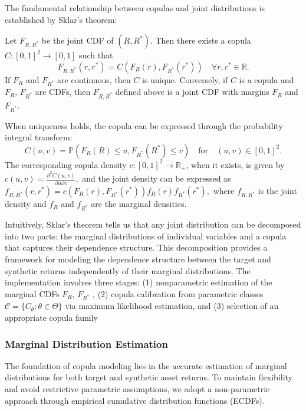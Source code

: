 The fundamental relationship between copulas and joint distributions is established by Sklar's theorem:

\begin{theorem}[Sklar (1959)]
Let $F_{R,R^*}$ be the joint CDF of $(R,R^*)$. Then there exists a copula $C: [0,1]^2 \to [0,1]$ such that
\begin{equation}
   F_{R,R^*}(r,r^*) = C(F_R(r), F_{R^*}(r^*)) \quad \forall r,r^* \in \mathbb{R}.
\end{equation}
If $F_R$ and $F_{R^*}$ are continuous, then $C$ is unique. Conversely, if $C$ is a copula and $F_R$, $F_{R^*}$ are CDFs, then $F_{R,R^*}$ defined above is a joint CDF with margins $F_R$ and $F_{R^*}$.
\end{theorem}
%
When uniqueness holds, the copula can be expressed through the probability integral transform: 
$$
C(u,v) = \mathbb P( F_R(R) \leq u, F_{R^*}(R^*) \leq v) 
\quad \text{for} \quad
(u,v)\in[0,1]^2
.
$$
The corresponding copula density $c:[0,1]^2\to\mathbb R_+$, when it exists, is given by
$
   c(u,v) = \frac{\partial^2 C(u,v)}{\partial u \partial v},
$
and the joint density can be expressed as
$
   f_{R,R^*}(r,r^*) = c(F_R(r), F_{R^*}(r^*)) f_R(r)f_{R^*}(r^*),
$
where $f_{R,R^*}$ is the joint density and $f_R$ and $f_{R^*}$ are the marginal densities.

Intuitively, Sklar's theorem tells us that any joint distribution can be decomposed into two parts: the marginal distributions of individual variables and a copula that captures their dependence structure. 
This decomposition provides a framework for modeling the dependence structure between the target and synthetic returns independently of their marginal distributions. The implementation involves three stages: (1) nonparametric estimation of the marginal CDFs $F_R$, $F_{R^*}$ , (2) copula calibration from parametric classes $\mathcal{C} = \{C_\theta : \theta \in \Theta\}$ via maximum likelihood estimation, and (3) selection of an appropriate copula family 



\subsubsection{Marginal Distribution Estimation}
The foundation of copula modeling lies in the accurate estimation of marginal distributions for both target and synthetic asset returns. To maintain flexibility and avoid restrictive parametric assumptions, we adopt a non-parametric approach through empirical cumulative distribution functions (ECDFs).

